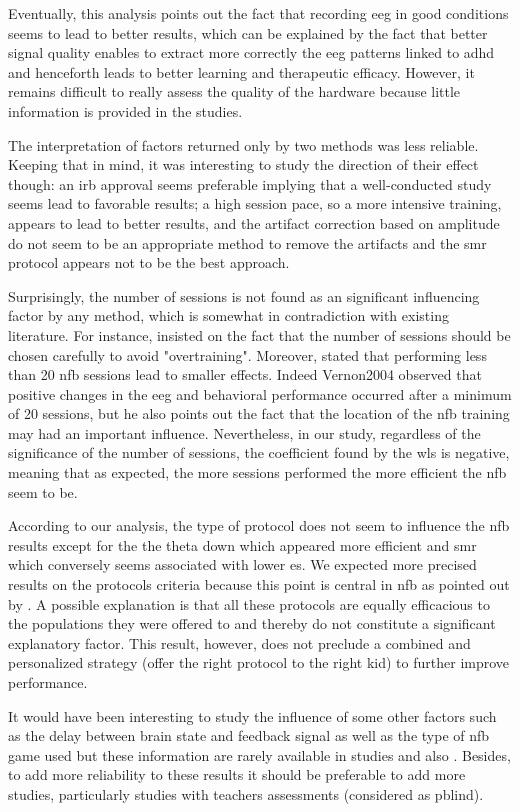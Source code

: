 Eventually, this analysis points out the fact that recording \gls{eeg} in good conditions seems to lead to better results, 
which can be explained by the fact that better signal quality enables to extract more correctly the \gls{eeg} 
patterns linked to \gls{adhd} and henceforth leads to better learning and therapeutic efficacy. However, it remains difficult to 
really assess the quality of the hardware because little information is provided in the studies.  

The interpretation of factors returned only by two methods was less reliable. Keeping that in mind, it was interesting 
to study the direction of their effect though: an \gls{irb} approval seems preferable implying that a well-conducted study 
seems lead to favorable results; a high session pace, so a more intensive training, appears to lead to better results,
and the artifact correction based on amplitude do not seem to be an appropriate method to remove the artifacts and the \gls{smr} protocol
appears not to be the best approach. 

Surprisingly, the number of sessions is not found as an significant influencing factor by any method, 
which is somewhat in contradiction with existing literature.
For instance, \citet{Enriquez2017} insisted on the fact that the number of sessions should be 
chosen carefully to avoid "overtraining". Moreover, \citet{Arns2014} stated that performing less than 20 \gls{nfb} sessions 
lead to smaller effects. Indeed {Vernon2004} observed that positive changes in the \gls{eeg} and behavioral 
performance occurred after a minimum of 20 sessions, but he also points out the fact that the
location of the \gls{nfb} training may had an important influence. 
Nevertheless, in our study, regardless of the significance of the number of sessions, the coefficient 
found by the \gls{wls} is negative, meaning that as expected,
the more sessions performed the more efficient the \gls{nfb} seem to be. 

According to our analysis, the type of protocol does not seem to influence the \gls{nfb} results except for the the theta down 
which appeared more efficient and \gls{smr} which conversely seems associated with lower \gls{es}. We expected 
more precised results on the protocols criteria because this point is central in \gls{nfb} as pointed out by \citet{Vernon2004}.
A possible explanation is that all these protocols are equally efficacious to the populations they were offered to and 
thereby do not constitute a significant explanatory factor. This result, however,
does not preclude a combined and personalized strategy (offer the right protocol to the right kid) to 
further improve performance. 

It would have been interesting to study the influence of some other factors such as the delay between brain state and feedback signal as well as the type of \gls{nfb} game used 
but these information are rarely available in studies and also . Besides, to add more reliability to these results it should be preferable to add more studies, 
particularly studies with teachers assessments (considered as \gls{pblind}). 

